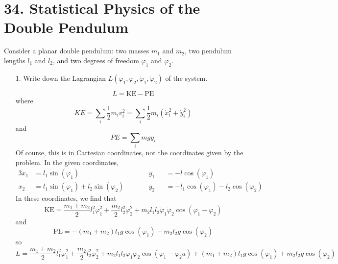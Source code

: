 \documentclass[a4paper,twoside]{article}
\begin{document}
\section*{34. Statistical Physics of the Double Pendulum}
Consider a planar double pendulum: two masses $ m_1 $ and $ m_2 $, two pendulum lengths $ l_1 $ and $ l_2 $, and two degrees of freedom $ \varphi_1 $ and $ \varphi_2 $.
\begin{itemize}
    \item[1.] Write down the Lagrangian $ L(\varphi_1, \varphi_2, \dot{\varphi}_1, \dot{\varphi}_2) $ of the system.
        \begin{problem}
            \begin{equation}
                L = \text{KE} - \text{PE}
            \end{equation}
            where
            \begin{equation}
                KE = \sum_i \frac{1}{2} m_i v_i^2 = \sum_i \frac{1}{2} m_i (\dot{x}_i^2 + \dot{y}_i^2)
            \end{equation}
            and
            \begin{equation}
                PE = \sum_i mgy_i
            \end{equation}
            Of course, this is in Cartesian coordinates, not the coordinates given by the problem. In the given coordinates,
            \begin{alignat}{3}
                x_1 &= l_1 \sin(\varphi_1) \qquad && y_1 &&= -l \cos(\varphi_1) \\
                x_2 &= l_1 \sin(\varphi_1) + l_2 \sin(\varphi_2) \qquad && y_2 &&= -l_1 \cos(\varphi_1) - l_2 \cos(\varphi_2)
            \end{alignat}
            In these coordinates, we find that
            \begin{equation}
                \text{KE} = \frac{m_1 + m_2}{2} l_1^2 \dot{\varphi}_1^2 + \frac{m_2}{2} l_2^2 \dot{\varphi}_2^2 + m_2 l_1 l_2 \dot{\varphi}_1 \dot{\varphi}_2 \cos(\varphi_1 - \varphi_2)
            \end{equation}
            and
            \begin{equation}
                \text{PE} = - (m_1 + m_2) l_1 g \cos(\varphi_1) - m_2 l_2 g \cos(\varphi_2)
            \end{equation}
            so
            \begin{equation}
                L = \frac{m_1 + m_2}{2} l_1^2 \dot{\varphi}_1^2 + \frac{m_2}{2} l_2^2 \dot{\varphi}_2^2 + m_2 l_1 l_2 \dot{\varphi}_1 \dot{\varphi}_2 \cos(\varphi_1 - \varphi_2a) + (m_1 + m_2) l_1 g \cos(\varphi_1) + m_2 l_2 g \cos(\varphi_2)

\end{equation}
\end{problem}
\end{itemize}
\end{document}
